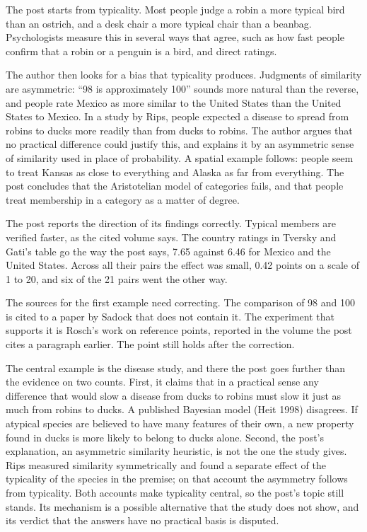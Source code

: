 \begin{afterword}
\summaryhead

The post starts from typicality. Most people judge a robin a more typical bird than an ostrich, and a desk chair a more typical chair than a beanbag. Psychologists measure this in several ways that agree, such as how fast people confirm that a robin or a penguin is a bird, and direct ratings.

The author then looks for a bias that typicality produces. Judgments of similarity are asymmetric: ``98 is approximately 100'' sounds more natural than the reverse, and people rate Mexico as more similar to the United States than the United States to Mexico. In a study by Rips, people expected a disease to spread from robins to ducks more readily than from ducks to robins. The author argues that no practical difference could justify this, and explains it by an asymmetric sense of similarity used in place of probability. A spatial example follows: people seem to treat Kansas as close to everything and Alaska as far from everything. The post concludes that the Aristotelian model of categories fails, and that people treat membership in a category as a matter of degree.

\responsehead

The post reports the direction of its findings correctly. Typical members are verified faster, as the cited volume says. The country ratings in Tversky and Gati's table go the way the post says, 7.65 against 6.46 for Mexico and the United States. Across all their pairs the effect was small, 0.42 points on a scale of 1 to 20, and six of the 21 pairs went the other way.

The sources for the first example need correcting. The comparison of 98 and 100 is cited to a paper by Sadock that does not contain it. The experiment that supports it is Rosch's work on reference points, reported in the volume the post cites a paragraph earlier. The point still holds after the correction.

The central example is the disease study, and there the post goes further than the evidence on two counts. First, it claims that in a practical sense any difference that would slow a disease from ducks to robins must slow it just as much from robins to ducks. A published Bayesian model (Heit 1998) disagrees. If atypical species are believed to have many features of their own, a new property found in ducks is more likely to belong to ducks alone. Second, the post's explanation, an asymmetric similarity heuristic, is not the one the study gives. Rips measured similarity symmetrically and found a separate effect of the typicality of the species in the premise; on that account the asymmetry follows from typicality. Both accounts make typicality central, so the post's topic still stands. Its mechanism is a possible alternative that the study does not show, and its verdict that the answers have no practical basis is disputed.


\end{afterword}
